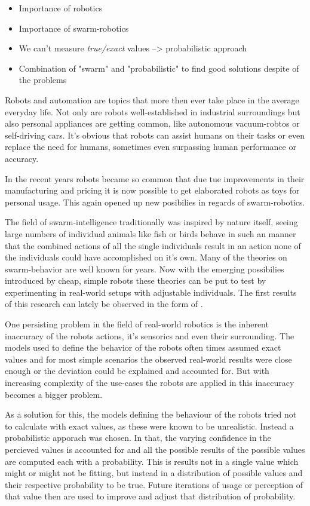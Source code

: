 \begin{itemize}
	\item{Importance of robotics}
	\item{Importance of swarm-robotics}
	\item{We can't measure \emph{true/exact} values --> probabilistic approach}
	\item{Combination of "swarm" and "probabilistic" to find good solutions despite of the problems}
\end{itemize}

Robots and automation are topics that more then ever take place in the average everyday life. Not only are robots well-established in industrial surroundings but also personal appliances are getting common, like autonomous vacuum-robtos or self-driving cars. It's obvious that robots can assist humans on their tasks or even replace the need for humans, sometimes even surpassing human performance or accuracy.

In the recent years robots became so common that due tue improvements in their manufacturing and pricing it is now possible to get elaborated robots as toys for personal usage. This again opened up new posibilies in regards of swarm-robotics.

The field of swarm-intelligence traditionally was inspired by nature itself, seeing large numbers of individual animals like fish or birds behave in such an manner that the combined actions of all the single individuals result in an action none of the individuals could have accomplished on it's own. Many of the theories on swarm-behavior are well known for years. Now with the emerging possibilies introduced by cheap, simple robots these theories can be put to test by experimenting in real-world setups with adjustable individuals. The first results of this research can lately be observed in the form of .

One persisting problem in the field of real-world robotics is the inherent inaccuracy of the robots actions, it's sensorics and even their surrounding. The models used to define the behavior of the robots often times assumed exact values and for most simple scenarios the observed real-world results were close enough or the deviation could be explained and accounted for. But with increasing complexity of the use-cases the robots are applied in this inaccuracy becomes a bigger problem.

As a solution for this, the models defining the behaviour of the robots tried not to calculate with exact values, as these were known to be unrealistic. Instead a probabilistic apporach was chosen. In that, the varying confidence in the percieved values is accounted for and all the possible results of the possible values are computed each with a probability. This is results not in a single value which might or might not be fitting, but instead in a distribution of possible values and their respective probability to be true. Future iterations of usage or perception of that value then are used to improve and adjust that distribution of probability.

